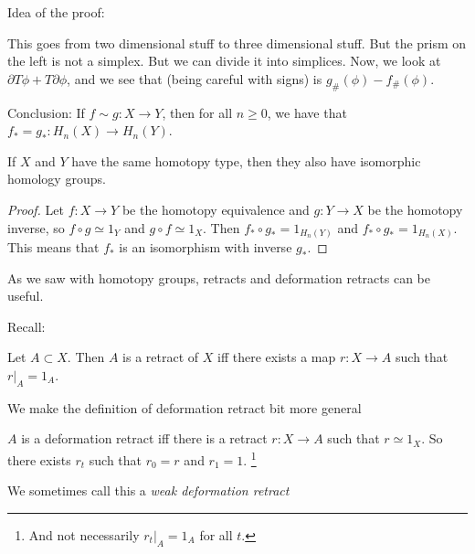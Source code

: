 Idea of the proof:

\begin{figure}[H]
    \centering
    \label{fig:chain-homotopic-proof}
\end{figure}

This goes from two dimensional stuff to three dimensional stuff.
But the prism on the left is not a simplex.
But we can divide it into simplices.
Now, we look at $\partial T \phi + T \partial \phi$, and we see that (being careful with signs) is $g_\#(\phi) - f_\#(\phi)$.


Conclusion: If $f \sim g: X \to  Y$, then for all $n \ge 0$, we have that $f_* = g_*: H_n(X) \to  H_n(Y)$.

\begin{theorem}
    If $X$ and $Y$ have the same homotopy type, then they also have isomorphic homology groups.
\end{theorem}
\begin{proof}
    Let $f: X \to  Y$ be the homotopy equivalence and $g:Y \to  X$ be the homotopy inverse, so $f  \circ  g \simeq 1_Y$ and $g  \circ  f \simeq 1_X$.
    Then $f_*  \circ  g_* = 1_{H_n(Y)}$ and $f_*  \circ  g_* = 1_{H_n(X)}$.
    This means that $f_*$ is an isomorphism with inverse $g_*$.
\end{proof}

As we saw with homotopy groups, retracts and deformation retracts can be useful.

Recall:
\begin{definition}
    Let $A \subset X$. Then $A$ is a retract of $X$ iff there exists a map $r: X \to  A$ such that $r|_A = 1_A$.
\end{definition}

We make the definition of deformation retract bit more general
\begin{definition}
    $A$ is a deformation retract iff there is a retract $r: X \to  A$ such that $r \simeq 1_X$.
    So there exists $r_t$ such that $r_0 = r$ and $r_1 = 1$. \footnote{And not necessarily $r_t|_A = 1_A$ for all $t$.}
\end{definition}

\begin{remark}
    We sometimes call this a \emph{weak deformation retract}
\end{remark}

